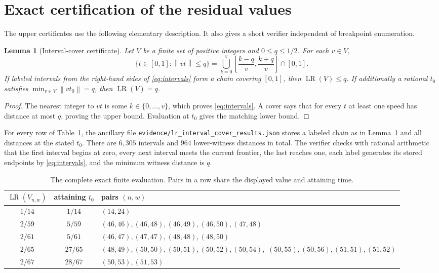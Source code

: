 \documentclass[11pt]{article}
\newtheorem{lemma}{Lemma}
\newcommand{\dist}[1]{\left\lVert #1\right\rVert}
\newcommand{\LR}{\operatorname{LR}}
\begin{document}
\section{Exact certification of the residual values}

The upper certificates use the following elementary description.  It also
gives a short verifier independent of breakpoint enumeration.

\begin{lemma}[Interval-cover certificate]\label{lem:cover}
Let \(V\) be a finite set of positive integers and \(0\leq q\leq1/2\).  For
each \(v\in V\),
\[
 \{t\in[0,1]:\dist{vt}\leq q\}
 =\bigcup_{k=0}^{v}
 \left[\frac{k-q}{v},\frac{k+q}{v}\right]\cap[0,1].
 \tag{4}\label{eq:intervals}
\]
If labeled intervals from the right-hand sides of \eqref{eq:intervals} form
a chain covering \([0,1]\), then \(\LR(V)\leq q\).  If additionally a
rational \(t_0\) satisfies
\(\min_{v\in V}\dist{vt_0}=q\), then \(\LR(V)=q\).
\end{lemma}

\begin{proof}
The nearest integer to \(vt\) is some \(k\in\{0,\ldots,v\}\), which proves
\eqref{eq:intervals}.  A cover says that for every \(t\) at least one speed
has distance at most \(q\), proving the upper bound.  Evaluation at \(t_0\)
gives the matching lower bound.
\end{proof}

For every row of Table~\ref{tab:values}, the ancillary file
\texttt{evidence/lr\_interval\_cover\_results.json} stores a labeled chain
as in Lemma~\ref{lem:cover} and all distances at the stated \(t_0\).  There
are \(6{,}305\) intervals and \(964\) lower-witness distances in total.  The
verifier checks with rational arithmetic that the first interval begins at
zero, every next interval meets the current frontier, the last reaches one,
each label generates its stored endpoints by \eqref{eq:intervals}, and the
minimum witness distance is \(q\).

\begin{table}[ht]
\centering
\small
\caption{The complete exact finite evaluation.  Pairs in a row share the
displayed value and attaining time.}\label{tab:values}
\begin{tabular}{c c p{}}
\toprule
\(\LR(V_{n,w})\)&attaining \(t_0\)&pairs \((n,w)\)\\
\midrule
\(1/14\)&\(1/14\)&\((14,24)\)\\
\(2/59\)&\(5/59\)&\((46,46),(46,48),(46,49),(46,50),(47,48)\)\\
\(2/61\)&\(5/61\)&\((46,47),(47,47),(48,48),(48,50)\)\\
\(2/65\)&\(27/65\)&\((48,49),(50,50),(50,51),(50,52),(50,54),\)
\newline \((50,55),(50,56),(51,51),(51,52)\)\\
\(2/67\)&\(28/67\)&\((50,53),(51,53)\)\\
\bottomrule
\end{tabular}
\end{table}
\end{document}
